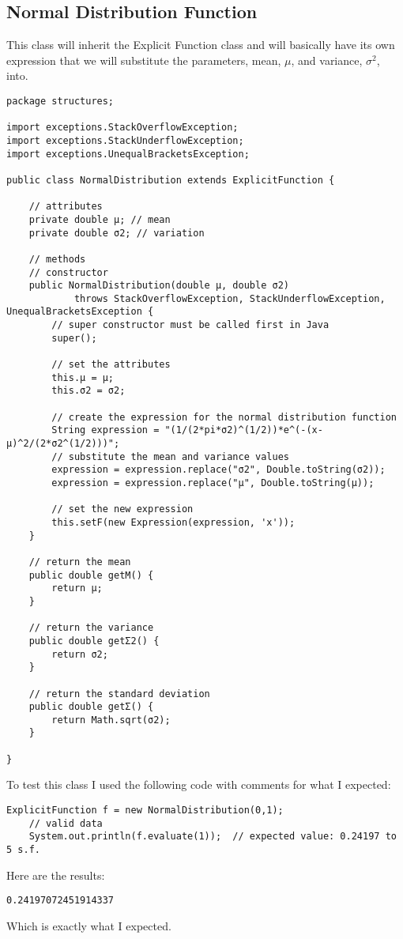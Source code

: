 \documentclass[../../../../main.tex]{subfiles}
\begin{document}
\subsection{Normal Distribution Function}
This class will inherit the Explicit Function class and will basically have its own expression that we will substitute the parameters, mean, $\mu$, and variance, $\sigma^2$, into.
\begin{verbatim}
package structures;

import exceptions.StackOverflowException;
import exceptions.StackUnderflowException;
import exceptions.UnequalBracketsException;

public class NormalDistribution extends ExplicitFunction {

	// attributes
	private double μ; // mean
	private double σ2; // variation

	// methods
	// constructor
	public NormalDistribution(double μ, double σ2)
			throws StackOverflowException, StackUnderflowException, UnequalBracketsException {
		// super constructor must be called first in Java
		super();

		// set the attributes
		this.μ = μ;
		this.σ2 = σ2;

		// create the expression for the normal distribution function
		String expression = "(1/(2*pi*σ2)^(1/2))*e^(-(x-μ)^2/(2*σ2^(1/2)))";
		// substitute the mean and variance values
		expression = expression.replace("σ2", Double.toString(σ2));
		expression = expression.replace("μ", Double.toString(μ));

		// set the new expression
		this.setF(new Expression(expression, 'x'));
	}

	// return the mean
	public double getΜ() {
		return μ;
	}

	// return the variance
	public double getΣ2() {
		return σ2;
	}

	// return the standard deviation
	public double getΣ() {
		return Math.sqrt(σ2);
	}

}
\end{verbatim}
To test this class I used the following code with comments for what I expected:
\begin{verbatim}
ExplicitFunction f = new NormalDistribution(0,1);
	// valid data
	System.out.println(f.evaluate(1));	// expected value: 0.24197 to 5 s.f.
\end{verbatim}
Here are the results:
\begin{verbatim}
0.24197072451914337
\end{verbatim}
Which is exactly what I expected.
\newpage
\end{document}
